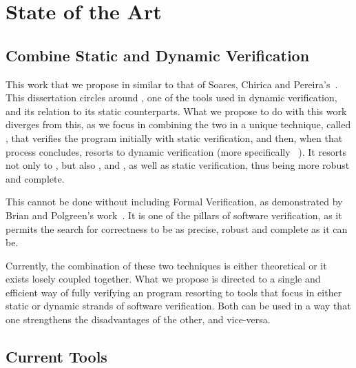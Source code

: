
%

\makeatletter
\newcommand{\ntifpkgloaded}{%
  \@ifpackageloaded%
}
\makeatother


\chapter{State of the Art}
\label{cha:state_of_the_art}

\section{Combine Static and Dynamic Verification}
\label{sec:combine_static_and_dynamic_verification}

This work that we propose in similar to that of Soares, Chirica and Pereira's~\cite{Soares_Chirica_Pereira2024}. 
This dissertation circles around \gospellang, one of the tools used in 
dynamic verification, and its relation to its static counterparts. What we propose to do with this work 
diverges from this, as we focus in combining the two in a unique technique, called \monitors, that 
verifies the program initially with static verification, and then, when that process concludes, resorts to 
dynamic verification (more specifically \rac~\cite{Soares_Chirica_Pereira2024}). It resorts not only to 
\gospellang, but also \ortac, \why and \cameleer, as well as static verification, thus being more robust and 
complete.

This cannot be done without including Formal Verification, as demonstrated by Brian and Polgreen's 
work~\cite{Brian_Polgreen2025}. It is one of the pillars of software verification, as it permits the search for correctness 
to be as precise, robust and complete as it can be.

Currently, the combination of these two techniques is either theoretical or it exists losely coupled together. 
What we propose is directed to a single and efficient way of fully verifying an \ocaml program resorting to 
tools that focus in either static or dynamic strands of software verification. Both can be used in a way that 
one strengthens the disadvantages of the other, and vice-versa.

\section{Current Tools}
\label{sec:current_tools}

